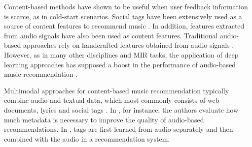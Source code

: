 Content-based methods have shown to be useful when user feedback information is scarce, as in cold-start scenarios. Social tags have been extensively used as a source of content features to recommend music \citep{Knees2013}. In addition, features extracted from audio signals have also been used as content features. Traditional audio-based approaches rely on handcrafted features obtained from audio signals \citep{Bogdanov2013rec}. However, as in many other disciplines and MIR tasks, the application of deep learning approaches has supposed a boost in the performance of audio-based music recommendation \citep{Oord2013}. 

Multimodal approaches for content-based music recommendation typically combine audio and textual data, which most commonly consists of web documents, lyrics and social tags \citep{liem2011need}. In \cite{Bogdanov2011}, for instance, the authors evaluate how much metadata is necessary to improve the quality of audio-based recommendations. In \cite{Eck:NIPS2007}, tags are first learned from audio separately and then combined with the audio in a recommendation system. 

